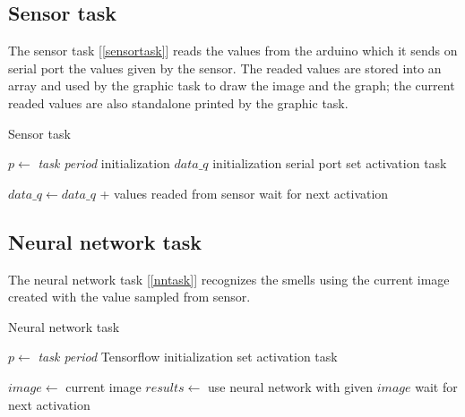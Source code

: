 \documentclass[12pt]{article}
\begin{document}
\subsection{Sensor task}
The sensor task [\ref{sensortask}] reads the values from the arduino which it
sends on serial port the values given by the sensor. The readed values are
stored into an array and used by the graphic task to draw the image and the
graph; the current readed values are also standalone printed by the graphic
task.

\begin{algorithm}[t]
\caption{Sensor task}
\label{sensortask}

\begin{algorithmic}
\State $p\gets$ \textit{task period}
\State initialization $data\_q$
\State initialization serial port
\State set activation task

\Loop
\State $data\_q\gets data\_q$ + values readed from sensor
\State wait for next activation
\EndLoop

\end{algorithmic}
\end{algorithm}

\subsection{Neural network task}
The neural network task [\ref{nntask}] recognizes the smells using the
current image created with the value sampled from sensor.

\begin{algorithm}[t]
\caption{Neural network task}
\label{nntask}

\begin{algorithmic}
\State $p\gets$ \textit{task period}
\State Tensorflow initialization
\State set activation task

\Loop
\State $image\gets$ current image
\State $results\gets$ use neural network with given $image$
\State wait for next activation
\EndLoop

\end{algorithmic}
\end{algorithm}
\end{document}
